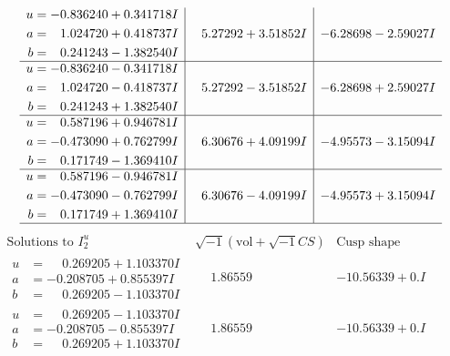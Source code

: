 \documentclass[1p]{elsarticle_modified}
\theoremstyle{definition}
\newcommand{\I}{\sqrt{-1}}
\begin{document}
$$\begin{array}{c|c|c}
\begin{aligned}
u &= -0.836240 + 0.341718 I \\
a &= \phantom{-}1.024720 + 0.418737 I \\
b &= \phantom{-}0.241243 - 1.382540 I\end{aligned}
 & \phantom{-}5.27292 + 3.51852 I & -6.28698 - 2.59027 I \\ \hline\begin{aligned}
u &= -0.836240 - 0.341718 I \\
a &= \phantom{-}1.024720 - 0.418737 I \\
b &= \phantom{-}0.241243 + 1.382540 I\end{aligned}
 & \phantom{-}5.27292 - 3.51852 I & -6.28698 + 2.59027 I \\ \hline\begin{aligned}
u &= \phantom{-}0.587196 + 0.946781 I \\
a &= -0.473090 + 0.762799 I \\
b &= \phantom{-}0.171749 - 1.369410 I\end{aligned}
 & \phantom{-}6.30676 + 4.09199 I & -4.95573 - 3.15094 I \\ \hline\begin{aligned}
u &= \phantom{-}0.587196 - 0.946781 I \\
a &= -0.473090 - 0.762799 I \\
b &= \phantom{-}0.171749 + 1.369410 I\end{aligned}
 & \phantom{-}6.30676 - 4.09199 I & -4.95573 + 3.15094 I\\
 \hline 
 \end{array}$$\newpage$$\begin{array}{c|c|c}  
\text{Solutions to }I^u_{2}& \I (\text{vol} + \sqrt{-1}CS) & \text{Cusp shape}\\
 \hline 
\begin{aligned}
u &= \phantom{-}0.269205 + 1.103370 I \\
a &= -0.208705 + 0.855397 I \\
b &= \phantom{-}0.269205 - 1.103370 I\end{aligned}
 & \phantom{-}1.86559\phantom{ +0.000000I} & -10.56339 + 0. I\phantom{ +0.000000I} \\ \hline\begin{aligned}
u &= \phantom{-}0.269205 - 1.103370 I \\
a &= -0.208705 - 0.855397 I \\
b &= \phantom{-}0.269205 + 1.103370 I\end{aligned}
 & \phantom{-}1.86559\phantom{ +0.000000I} & -10.56339 + 0. I\phantom{ +0.000000I} \\ \hline\begin{aligned}

\end{aligned}
\end{array}$$
\end{document}
